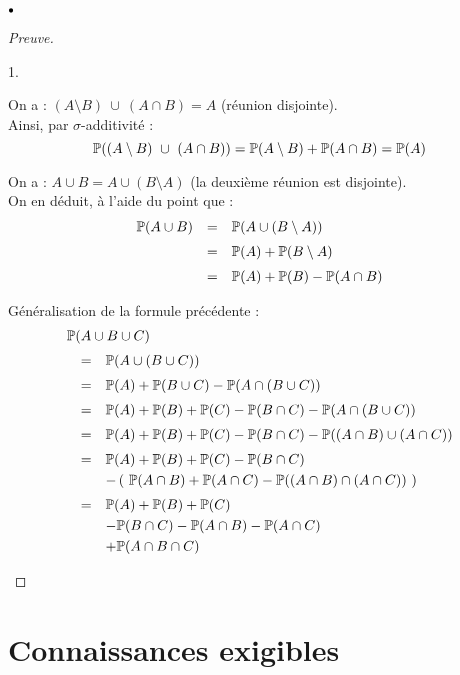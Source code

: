 \documentclass[11pt]{article}%
\begin{document}
\begin{noliste}{$\scriptstyle \bullet$}
\begin{proof}[Preuve]
\begin{noliste}{1.}
\item On a : $(A \setminus B) \ \cup \ (A \cap B) = A$ (réunion
    disjointe).\\
    Ainsi, par $\sigma$-additivité :
    \[
    \mathbb{P}((A \setminus B) \ \cup \ (A \cap B)) = \mathbb{P}(A \setminus B)
    + \mathbb{P}(A \cap B) = \mathbb{P}(A)
    \]
\item On a : $A \cup B = A \cup (B \setminus A)$ (la deuxième
    réunion est disjointe).\\
    On en déduit, à l'aide du point  que :
    \[
    \begin{array}{rcl}
      \mathbb{P}(A \cup B) & = & \mathbb{P}(A \cup (B \setminus A)) \\[.2cm]
      & = & \mathbb{P}(A) + \mathbb{P}(B \setminus A) \\[.2cm]
      & = & \mathbb{P}(A) + \mathbb{P}(B) - \mathbb{P}(A \cap B)
    \end{array}
    \]    

  \item Généralisation de la formule précédente :
    \[
    \begin{array}{rcl}
      \multicolumn{3}{l}{\Prob(A \cup B \cup C)} \\[.2cm]
      & = & \Prob(A \cup (B \cup C)) \\[.2cm]
      & = & \Prob(A) + \Prob(B \cup C) - \Prob(A \cap (B \cup C)) 
\\[.2cm]
      & = & \Prob(A) + \Prob(B) + \Prob(C) - \Prob(B \cap C) - 
      \Prob(A \cap (B \cup C)) \\[.2cm]
      & = & \Prob(A) + \Prob(B) + \Prob(C) - \Prob(B \cap C) - 
      \Prob((A \cap B) \cup (A \cap C)) \\[.2cm]
      & = & \Prob(A) + \Prob(B) + \Prob(C) - \Prob(B \cap C) \\[.1cm]
      & & - \left( \ \Prob(A \cap B) + \Prob(A \cap C) - \Prob((A \cap 
B) \cap 
        (A \cap C)) \ \right)\\[.2cm]
      & = & \Prob(A) + \Prob(B) + \Prob(C) \\[.1cm]
      & & - \Prob(B \cap C) - \Prob(A \cap B) - \Prob(A \cap C) \\[.1cm]
      & & + \Prob(A \cap B \cap C)
    \end{array}
    \]
\end{noliste}
\end{proof}
\end{noliste}


\section*{Connaissances exigibles}
\end{document}
